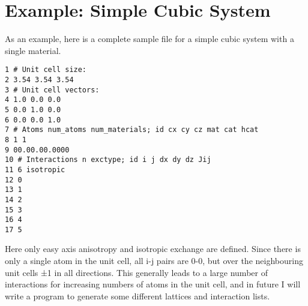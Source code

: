 \section*{Example: Simple Cubic System}
As an example, here is a complete sample file for a simple cubic system with a single material.
\begin{verbatim}
1 # Unit cell size:
2 3.54 3.54 3.54
3 # Unit cell vectors:
4 1.0 0.0 0.0
5 0.0 1.0 0.0
6 0.0 0.0 1.0
7 # Atoms num_atoms num_materials; id cx cy cz mat cat hcat
8 1 1
9 00.00.00.0000
10 # Interactions n exctype; id i j dx dy dz Jij
11 6 isotropic
12 0
13 1
14 2
15 3
16 4
17 5
\end{verbatim}
Here only easy axis anisotropy and isotropic exchange are defined. Since there is only a single atom in the unit cell, all i-j pairs are 0-0, but over the neighbouring unit cells ±1 in all directions. This generally
leads to a large number of interactions for increasing numbers of atoms in the unit cell, and in future I will write a program to generate some different lattices and interaction lists.
 








%
